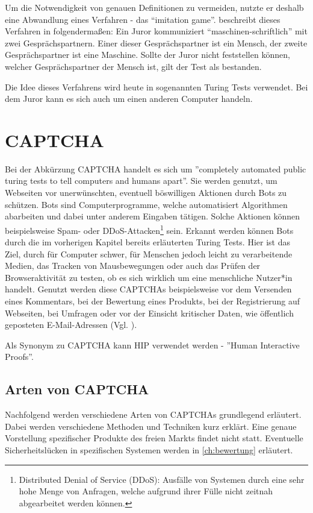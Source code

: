 Um die Notwendigkeit von genauen Definitionen zu vermeiden, nutzte er deshalb eine Abwandlung eines Verfahren - das ``imitation game''. 
\citeauthor{pallay2020turing} beschreibt dieses Verfahren in \cite[p.11ff]{pallay2020turing} folgendermaßen:
Ein Juror kommuniziert ``maschinen-schriftlich'' mit zwei Gesprächspartnern. Einer dieser Gesprächspartner ist ein Mensch, der zweite Gesprächspartner ist eine Maschine.
Sollte der Juror nicht feststellen können, welcher Gesprächspartner der Mensch ist, gilt der Test als bestanden.

Die Idee dieses Verfahrens wird heute in sogenannten Turing Tests verwendet.
Bei dem Juror kann es sich auch um einen anderen Computer handeln.

\pagebreak

\section{CAPTCHA}
\label{ch:basics:captcha}
Bei der Abkürzung CAPTCHA handelt es sich um ''completely automated public turing tests to tell computers and humans apart''. 
Sie werden genutzt, um Webseiten vor unerwünschten, eventuell böswilligen Aktionen durch Bots zu schützen. 
Bots sind Computerprogramme, welche automatisiert Algorithmen abarbeiten und dabei unter anderem Eingaben tätigen.
Solche Aktionen können beispielsweise Spam- oder 
DDoS-Attacken\footnote[1]{Distributed Denial of Service (DDoS): Ausfälle von Systemen durch eine sehr hohe Menge von Anfragen, 
welche aufgrund ihrer Fülle nicht zeitnah abgearbeitet werden können.} sein.
Erkannt werden können Bots durch die im vorherigen Kapitel bereits erläuterten Turing Tests. 
Hier ist das Ziel, durch für Computer schwer, für Menschen jedoch leicht zu verarbeitende Medien, das Tracken von Mausbewegungen
oder auch das Prüfen der Browseraktivität zu testen, ob es sich wirklich um eine menschliche Nutzer*in handelt.
Genutzt werden diese CAPTCHAs beispielsweise vor dem Versenden eines Kommentars, bei der Bewertung eines Produkts, bei der Registrierung auf Webseiten,
bei Umfragen oder vor der Einsicht kritischer Daten, wie öffentlich geposteten E-Mail-Adressen (Vgl. \cite{moradi}).

Als Synonym zu CAPTCHA kann HIP verwendet werden - ''Human Interactive Proofs''. 

\subsection{Arten von CAPTCHA}
\label{ch:basics:captcha:arten}
Nachfolgend werden verschiedene Arten von CAPTCHAs grundlegend erläutert.
Dabei werden verschiedene Methoden und Techniken kurz erklärt. 
Eine genaue Vorstellung spezifischer Produkte des freien Markts findet nicht statt.
Eventuelle Sicherheitslücken in spezifischen Systemen werden in \autoref{ch:bewertung} erläutert.

